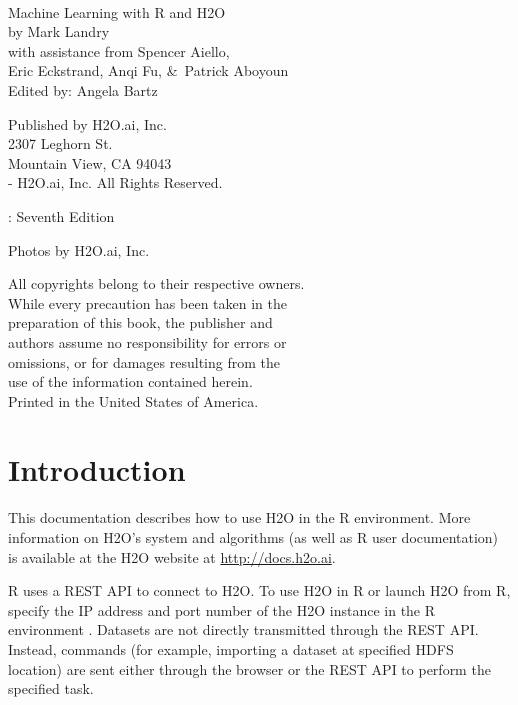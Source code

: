 {\raggedright\vfill\

Machine Learning with R and H2O\\

  by Mark Landry\\
  with assistance from Spencer Aiello, \\ 
  Eric Eckstrand, Anqi Fu, \&\ Patrick Aboyoun\\
Edited by: Angela Bartz

\bigskip
Published by H2O.ai, Inc. \\
2307 Leghorn St. \\
Mountain View, CA 94043\\
\bigskip
{}-\the\year \hspace{1pt} H2O.ai, Inc. All Rights Reserved.
\bigskip

\monthname \hspace{1pt}  \the\year: Seventh Edition
\bigskip

Photos by \textcopyright H2O.ai, Inc.
\bigskip

All copyrights belong to their respective owners.\\
While every precaution has been taken in the\\
preparation of this book, the publisher and\\
authors assume no responsibility for errors or\\
omissions, or for damages resulting from the\\
use of the information contained herein.\\
\bigskip
Printed in the United States of America.




\newpage
\thispagestyle{empty}%
\tableofcontents
\thispagestyle{empty}%


\newpage


\section{Introduction}

This documentation describes how to use H2O in the R environment. More information on H2O's system and algorithms (as well as R user documentation) is available at the H2O website at {\url{http://docs.h2o.ai}}.

R uses a REST API to connect to H2O. To use H2O in R or launch H2O from R, specify the IP address and port number of the H2O instance in the R environment . Datasets are not directly transmitted through the REST API. Instead, commands (for example, importing a dataset at specified HDFS location) are sent either through the browser or the REST API to perform the specified task.

}
